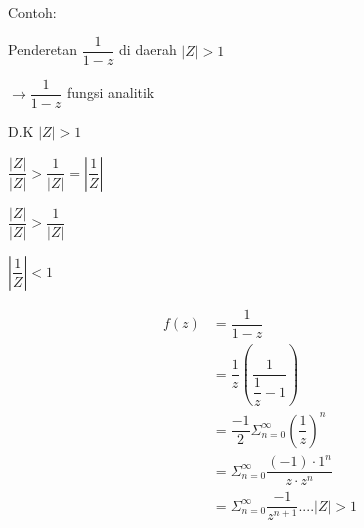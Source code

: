 \documentclass{article}
\begin{document}
\leavevmode\\

Contoh:

Penderetan $\dfrac{1}{1-z}$ di daerah $|Z|>1$

$\rightarrow \dfrac{1}{1-z}$ fungsi analitik

D.K $|Z|>1$

$\dfrac{|Z|}{|Z|}>\dfrac{1}{|Z|} = |\dfrac{1}{Z}|$

$\dfrac{|Z|}{|Z|}>\dfrac{1}{|Z|}$

$|\dfrac{1}{Z}|<1$

\begin{align*}
    f(z) & = \dfrac{1}{1-z}
    \nonumber                                                          \\
         & = \dfrac{1}{z} (\dfrac{1}{\dfrac{1}{z}-1})
    \nonumber                                                          \\
         & = \dfrac{-1}{2} \Sigma_{n=0}^{\infty}(\dfrac{1}{z})^n
    \nonumber                                                          \\
         & = \Sigma_{n=0}^{\infty} \dfrac{(-1) \cdot 1^n}{z \cdot z^n}
    \nonumber                                                          \\
         & = \Sigma_{n=0}^{\infty} \dfrac{-1}{z^{n+1}} .... |Z|>1
\end{align*}
\end{document}
